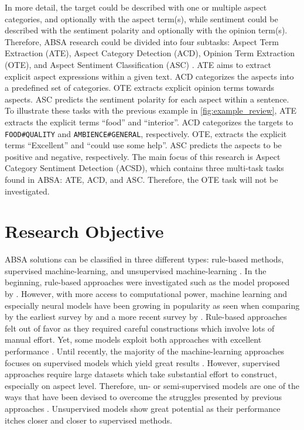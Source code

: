 \documentclass[american, oneside]{ecsgdp}
\begin{document}
In more detail, the target could be described with one or multiple aspect categories, and optionally with the aspect term(s), while sentiment could be described with the sentiment polarity and optionally with the opinion term(s). Therefore, ABSA research could be divided into four subtasks: Aspect Term Extraction (ATE), Aspect Category Detection (ACD), Opinion Term Extraction (OTE), and Aspect Sentiment Classification (ASC) \parencite{Zhang2022Survey}. ATE aims to extract explicit aspect expressions within a given text. ACD categorizes the aspects into a predefined set of categories. OTE extracts explicit opinion terms towards aspects. ASC predicts the sentiment polarity for each aspect within a sentence. To illustrate these tasks with the previous example in \cref{fig:example_review}, ATE extracts the explicit terms ``food'' and ``interior''. ACD categorizes the targets to \texttt{FOOD\#QUALITY} and \texttt{AMBIENCE\#GENERAL}, respectively. OTE, extracts the explicit terms ``Excellent'' and ``could use some help''. ASC predicts the aspects to be positive and negative, respectively. The main focus of this research is Aspect Category Sentiment Detection (ACSD), which contains three multi-task tasks found in ABSA: ATE, ACD, and ASC. Therefore, the OTE task will not be investigated.

\section{Research Objective} \label{sec:objective}
ABSA solutions can be classified in three different types: rule-based methods, supervised machine-learning, and unsupervised machine-learning \parencite{Schouten2016Survey}. In the beginning, rule-based approaches were investigated such as the model proposed by \textcite{Hu2004Rules}. However, with more access to computational power, machine learning and especially neural models have been growing in popularity as seen when comparing by the earliest survey by \textcite{Schouten2016Survey} and a more recent survey by \textcite{Zhang2022Survey}. Rule-based approaches felt out of favor as they required careful constructions which involve lots of manual effort. Yet, some models exploit both approaches with excellent performance \parencite{Trusca2020HAABSA++, Meskele2020ALDONAr}. Until recently, the majority of the machine-learning approaches focuses on supervised models which yield great results \parencite{Zhang2022Survey}. However, supervised approaches require large datasets which take substantial effort to construct, especially on aspect level. Therefore, un- or semi-supervised models are one of the ways that have been devised to overcome the struggles presented by previous approaches \parencite{He2017ABAE}. Unsupervised models show great potential as their performance itches closer and closer to supervised methods. %
\end{document}
